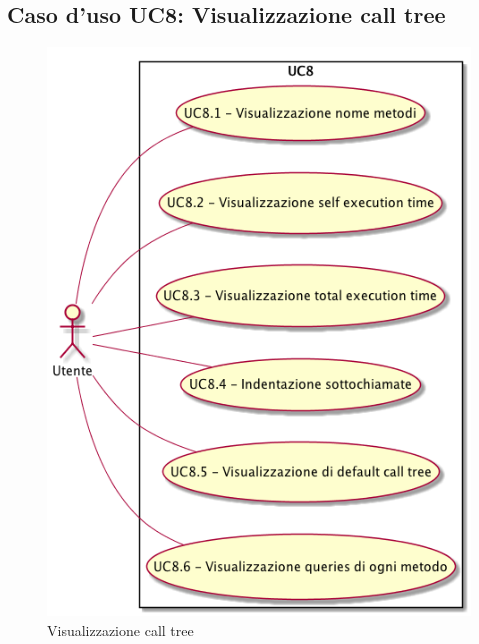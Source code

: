 \subsection{Caso d'uso UC8: Visualizzazione call tree}
\begin{figure} [H]
\centering
\includegraphics[scale=0.45]{./UC/UC8.png}
\caption{Visualizzazione call tree}\label{}
\end{figure}
